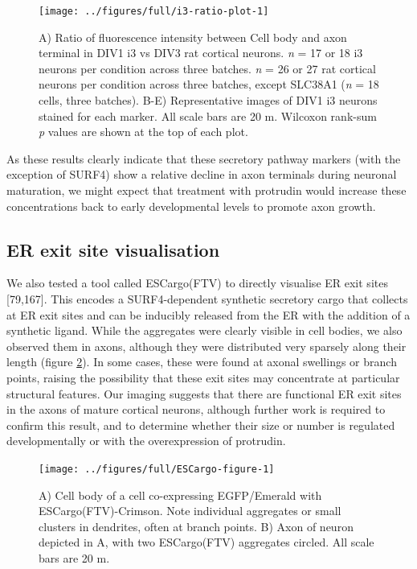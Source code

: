\documentclass[
  12pt,
  a4paper,
]{book}
\begin{document}
\begin{figure}
\texttt{[image: ../figures/full/i3-ratio-plot-1]} \caption[Comparison of marker localisation between i3 neurons and rat cortical neurons]{A) Ratio of fluorescence intensity between Cell body and axon terminal in DIV1 i3 vs DIV3 rat cortical neurons. \emph{n} = 17 or 18 i3 neurons per condition across three batches. \emph{n} = 26 or 27 rat cortical neurons per condition across three batches, except SLC38A1 (\emph{n} = 18 cells, three batches). B-E) Representative images of DIV1 i3 neurons stained for each marker. All scale bars are 20 \textmu{}m. Wilcoxon rank-sum \emph{p} values are shown at the top of each plot.}\label{fig:i3-ratio-plot}
\end{figure}

As these results clearly indicate that these secretory pathway markers (with the exception of SURF4) show a relative decline in axon terminals during neuronal maturation, we might expect that treatment with protrudin would increase these concentrations back to early developmental levels to promote axon growth.

\subsection{ER exit site visualisation}\label{er-exit-site-visualisation}

We also tested a tool called ESCargo(FTV) to directly visualise ER exit sites {[}79,167{]}. This encodes a SURF4-dependent synthetic secretory cargo that collects at ER exit sites and can be inducibly released from the ER with the addition of a synthetic ligand. While the aggregates were clearly visible in cell bodies, we also observed them in axons, although they were distributed very sparsely along their length (figure \ref{fig:ESCargo-figure}). In some cases, these were found at axonal swellings or branch points, raising the possibility that these exit sites may concentrate at particular structural features. Our imaging suggests that there are functional ER exit sites in the axons of mature cortical neurons, although further work is required to confirm this result, and to determine whether their size or number is regulated developmentally or with the overexpression of protrudin.

\begin{figure}
\texttt{[image: ../figures/full/ESCargo-figure-1]} \caption[ESCargo localisation in cortical neurons]{A) Cell body of a cell co-expressing EGFP/Emerald with ESCargo(FTV)-Crimson.  Note individual aggregates or small clusters in dendrites, often at branch points.  B) Axon of neuron depicted in A, with two ESCargo(FTV) aggregates circled.  All scale bars are 20 \textmu{}m.}\label{fig:ESCargo-figure}
\end{figure}
\end{document}
